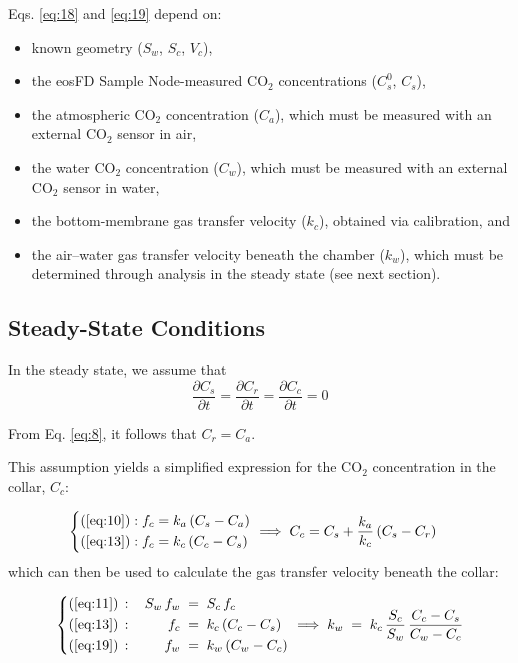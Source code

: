 \documentclass[11pt]{article}
\begin{document}
Eqs. \ref{eq:18} and \ref{eq:19} depend on:
\begin{itemize}
	\item known geometry ($S_w$, $S_c$, $V_c$),
	\item the eosFD Sample Node-measured CO$_2$ concentrations ($C_s^0$, $C_s$),
	\item the atmospheric CO$_2$ concentration ($C_a$), which must be measured with an external CO$_2$ sensor in air,
	\item the water CO$_2$ concentration ($C_w$), which must be measured with an external CO$_2$ sensor in water,
	\item the bottom-membrane gas transfer velocity ($k_c$), obtained via calibration, and
	\item the air--water gas transfer velocity beneath the chamber ($k_w$), which must be determined through analysis in the steady state (see next section).
\end{itemize}

\subsection{Steady-State Conditions}
In the steady state, we assume that
\begin{equation*}
	\dfrac{\partial C_s}{\partial t} = \dfrac{\partial C_r}{\partial t} = \dfrac{\partial C_c}{\partial t} = 0
\end{equation*}

From Eq. \ref{eq:8}, it follows that $C_r = C_a$.

This assumption yields a simplified expression for the CO$_2$ concentration in the collar, $C_c$:

\begin{equation}
	\left\{
	\begin{aligned}
		(\ref{eq:10}): f_c &= k_a\,(C_s - C_a) \\
		(\ref{eq:13}): f_c &= k_c\,(C_c - C_s)  \\
	\end{aligned}
	\right.
	\;\Longrightarrow\;
	C_c = C_s + \frac{k_a}{k_c}\,(C_s - C_r) \quad 
	\label{eq:20}
\end{equation}
which can then be used to calculate the gas transfer velocity beneath the collar:

\begin{equation}
	\left\{
	\begin{alignedat}{4}
		(\ref{eq:11}) \,&:\,&\quad S_w\,f_w \;=\;&\; S_c\,f_c \\
		(\ref{eq:13})\,&:\,&\quad f_c      \;=\;&\; k_c\,(C_c - C_s) \\
		(\ref{eq:19})\,&:\,&\quad f_w      \;=\;&\; k_w\,(C_w - C_c)
	\end{alignedat}
	\right.
	\;\Longrightarrow\;
	k_w \;=\; k_c\,\frac{S_c}{S_w}\,
	\frac{C_c - C_s}{C_w - C_c}
	\label{eq:21}
\end{equation}
\end{document}
